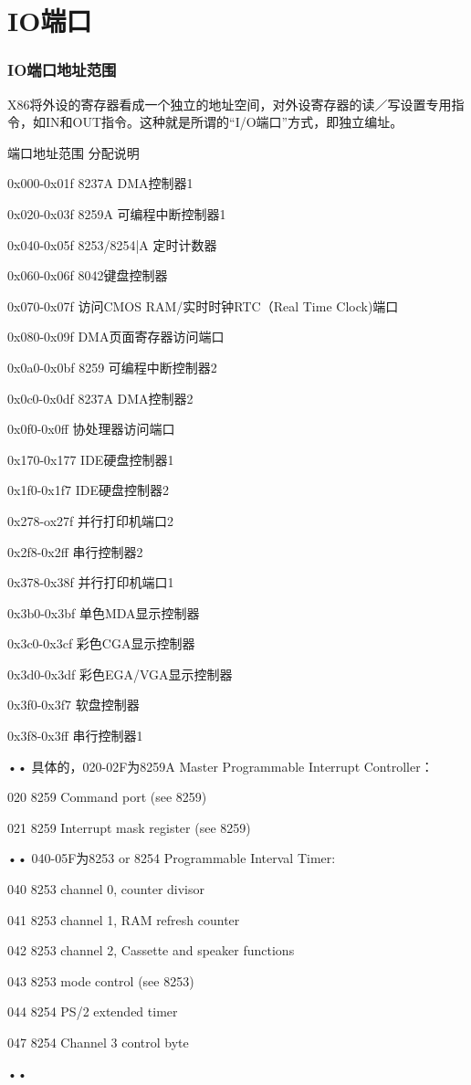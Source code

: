 \documentclass[12pt]{article}
\begin{document}
\part{IO端口}
\section{IO端口地址范围}
X86将外设的寄存器看成一个独立的地址空间，对外设寄存器的读／写设置专用指令，如IN和OUT指令。这种就是所谓的“I/O端口”方式，即独立编址。
\begin{list}{•}{•}
\item 端口地址范围  分配说明
\item 0x000-0x01f 8237A DMA控制器1
\item 0x020-0x03f 8259A 可编程中断控制器1
\item 0x040-0x05f 8253/8254|A 定时计数器
\item 0x060-0x06f 8042键盘控制器
\item 0x070-0x07f 访问CMOS RAM/实时时钟RTC（Real Time Clock)端口
\item 0x080-0x09f DMA页面寄存器访问端口
\item 0x0a0-0x0bf 8259 可编程中断控制器2
\item 0x0c0-0x0df 8237A DMA控制器2
\item 0x0f0-0x0ff 协处理器访问端口
\item 0x170-0x177 IDE硬盘控制器1
\item 0x1f0-0x1f7 IDE硬盘控制器2
\item 0x278-ox27f 并行打印机端口2
\item 0x2f8-0x2ff 串行控制器2
\item 0x378-0x38f 并行打印机端口1 
\item 0x3b0-0x3bf 单色MDA显示控制器
\item 0x3c0-0x3cf 彩色CGA显示控制器
\item 0x3d0-0x3df 彩色EGA/VGA显示控制器
\item 0x3f0-0x3f7 软盘控制器
\item 0x3f8-0x3ff 串行控制器1
\end{list}{•}{•}
具体的，020-02F为8259A Master Programmable Interrupt Controller：
\begin{list}{•}{•}
\item 020 8259 Command port (see 8259)
\item 021 8259 Interrupt mask register (see 8259)
\end{list}{•}{•}
040-05F为8253 or 8254 Programmable Interval Timer:
\begin{list}{•}{•}
\item 040 8253 channel 0, counter divisor
\item 041 8253 channel 1, RAM refresh counter
\item 042 8253 channel 2, Cassette and speaker functions
\item 043 8253 mode control (see 8253)
\item 044 8254 PS/2 extended timer
\item 047 8254 Channel 3 control byte
\end{list}{•}{•}
\end{document}
